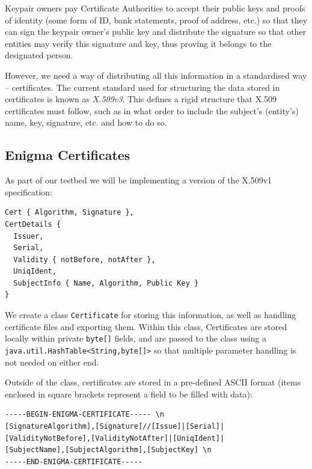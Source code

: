   Keypair owners pay Certificate Authorities to accept their public keys and proofs of identity (some form of ID, bank statements, proof of address, etc.) so that they can sign the keypair owner's public key and distribute the signature so that other entities may verify this signature and key, thus proving it belongs to the designated person.
  
  However, we need a way of distributing all this information in a standardised way -- certificates. The current standard used for structuring the data stored in certificates is known as \emph{X.509v3}\cite{Cooper:2008aa}. This defines a rigid structure that X.509 certificates must follow, such as in what order to include the subject's (entity's) name, key, signature, etc. and how to do so.
  
  \subsection{Enigma Certificates}
  
  As part of our testbed we will be implementing a version of the X.509v1 specification\cite{Kent:1993aa}: \\
  
  \begin{lstlisting}
Cert { Algorithm, Signature },
CertDetails {
  Issuer,
  Serial,
  Validity { notBefore, notAfter },
  UniqIdent,
  SubjectInfo { Name, Algorithm, Public Key }
}
\end{lstlisting}
  
  We create a class \verb!Certificate! for storing this information, as well as handling certificate files and exporting them. Within this class, Certificates are stored locally within private \verb!byte[]! fields, and are passed to the class using a \verb!java.util.HashTable<String,byte[]>! so that multiple parameter handling is not needed on either end.
  
  Outside of the class, certificates are stored in a pre-defined ASCII format (items enclosed in square brackets represent a field to be filled with data): \\
  
  \begin{lstlisting}
-----BEGIN-ENIGMA-CERTIFICATE----- \n
[SignatureAlgorithm],[Signature]//[Issue]|[Serial]|
[ValidityNotBefore],[ValidityNotAfter]|[UniqIdent]|
[SubjectName],[SubjectAlgorithm],[SubjectKey] \n
-----END-ENIGMA-CERTIFICATE-----
\end{lstlisting}

